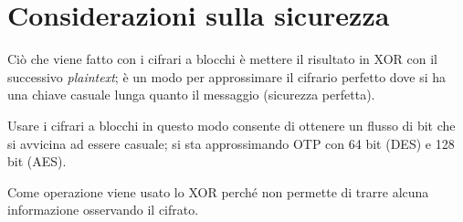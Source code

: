 \section{Considerazioni sulla sicurezza}

Ciò che viene fatto con i cifrari a blocchi è mettere il risultato 
in XOR con il successivo \textit{plaintext}; è un modo per approssimare il 
cifrario perfetto dove si ha una chiave casuale lunga quanto il messaggio (sicurezza 
perfetta).

\noindent Usare i cifrari a blocchi in questo modo consente di ottenere 
un flusso di bit che si avvicina ad essere casuale; si sta approssimando OTP con 
64 bit (DES) e 128 bit (AES).

\noindent Come operazione viene usato lo XOR perché non permette di trarre alcuna 
informazione osservando il cifrato.




